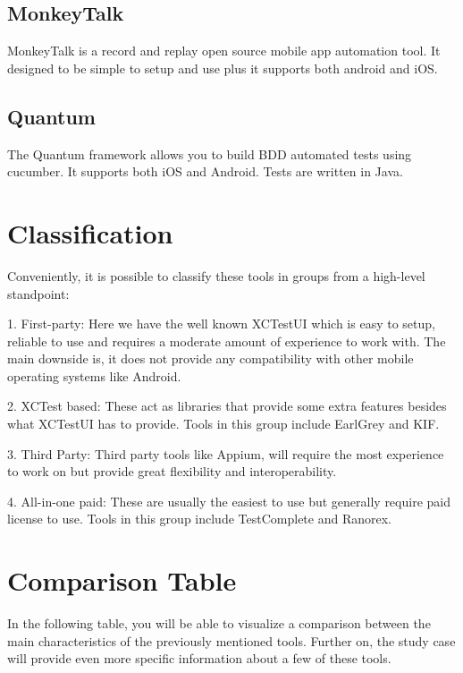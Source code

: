 \subsection {MonkeyTalk}
MonkeyTalk is a record and replay open source mobile app automation tool. It designed to be simple to setup and use plus it supports both android and iOS. \cite{MonkeyTalk}

\subsection {Quantum}
The Quantum framework allows you to build BDD automated tests using cucumber. It supports both iOS and Android. Tests are written in Java. \cite{Quantum}

\section{Classification}
Conveniently, it is possible to classify these tools in groups from a high-level standpoint:

1. First-party: Here we have the well known XCTestUI which is easy to setup, reliable to use and requires a moderate amount of experience to work with. The main downside is, it does not provide any compatibility with other mobile operating systems like Android.

2. XCTest based: These act as libraries that provide some extra features besides what XCTestUI has to provide. Tools in this group include EarlGrey and KIF.

3. Third Party: Third party tools like Appium, will require the most experience to work on but provide great flexibility and interoperability.

4. All-in-one paid:  These are usually the easiest to use but generally require paid license to use. Tools in this group include TestComplete and Ranorex.

\section{Comparison Table}

In the following table, you will be able to visualize a comparison between the main characteristics of the previously mentioned tools. Further on, the study case will provide even more specific information about a few of these tools.

